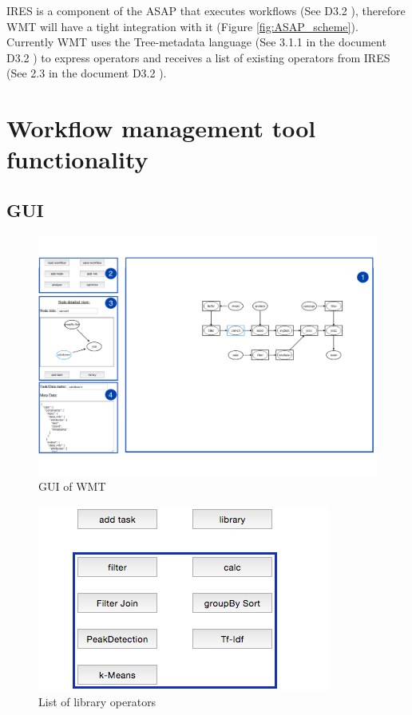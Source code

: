 \documentclass[12pt,openany,onecolumn]{book}
\begin{document}
IRES is a component of the ASAP that executes workflows (See D3.2 \cite{d3.2}), therefore WMT will have a tight integration with it (Figure \ref{fig:ASAP_scheme}). Currently WMT uses the Tree-metadata language (See 3.1.1 in the document D3.2 \cite{d3.2}) to express operators and receives a list of existing operators from IRES (See 2.3 in the document D3.2 \cite{d3.2}).

\chapter{Workflow management tool functionality}\label{chapt:functionality}

\section{GUI}\label{sec:gui}

\begin{figure}[h]
\centering
\includegraphics[width=\linewidth]{figs/scheme}
\caption{GUI of WMT}\label{fig:scheme}
\end{figure}

\begin{figure}[h]
\centering
\includegraphics[scale=0.75]{figs/lib_buttons}
\caption{List of library operators}\label{fig:lib_buttons}
\end{figure}
\end{document}
